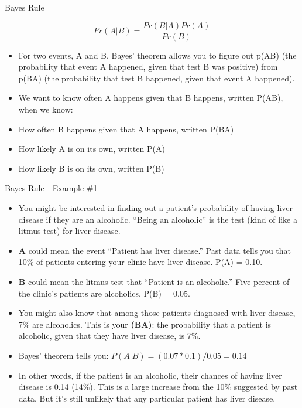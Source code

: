 \documentclass[
  ignorenonframetext,
]{beamer}
\begin{document}
\begin{frame}{Bayes Rule}
\protect\hypertarget{bayes-rule-2}{}

\[Pr(A|B) = \frac{Pr(B|A)Pr(A)}{Pr(B)}\]

\begin{itemize}
\item
  For two events, A and B, Bayes' theorem allows you to figure out
  p(A\textbar B) (the probability that event A happened, given that test
  B was positive) from p(B\textbar A) (the probability that test B
  happened, given that event A happened).
\item
  We want to know often A happens given that B happens, written
  P(A\textbar B), when we know:
\item
  How often B happens given that A happens, written P(B\textbar A)
\item
  How likely A is on its own, written P(A)
\item
  How likely B is on its own, written P(B)
\end{itemize}

\end{frame}

\begin{frame}{Bayes Rule - Example \#1}
\protect\hypertarget{bayes-rule---example-1}{}

\begin{itemize}
\item
  You might be interested in finding out a patient's probability of
  having liver disease if they are an alcoholic. ``Being an alcoholic''
  is the test (kind of like a litmus test) for liver disease.
\item
  \textbf{A} could mean the event ``Patient has liver disease.'' Past
  data tells you that 10\% of patients entering your clinic have liver
  disease. P(A) = 0.10.
\item
  \textbf{B} could mean the litmus test that ``Patient is an
  alcoholic.'' Five percent of the clinic's patients are alcoholics.
  P(B) = 0.05.
\item
  You might also know that among those patients diagnosed with liver
  disease, 7\% are alcoholics. This is your \textbf{(B\textbar A)}: the
  probability that a patient is alcoholic, given that they have liver
  disease, is 7\%.
\item
  Bayes' theorem tells you: \(P(A|B) = (0.07 * 0.1)/0.05 = 0.14\)
\item
  In other words, if the patient is an alcoholic, their chances of
  having liver disease is 0.14 (14\%). This is a large increase from the
  10\% suggested by past data. But it's still unlikely that any
  particular patient has liver disease.
\end{itemize}

\end{frame}
\end{document}
